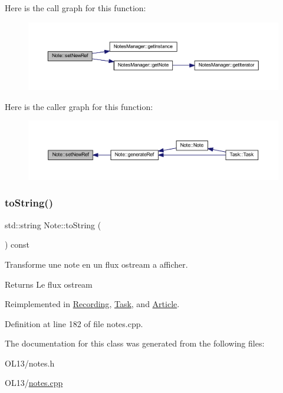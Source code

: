 Here is the call graph for this function\+:\nopagebreak
\begin{figure}[H]
\begin{center}
\leavevmode
\includegraphics[width=350pt]{class_note_a3af2edc369310b9f122bd1fd6dbfa717_cgraph}
\end{center}
\end{figure}
Here is the caller graph for this function\+:\nopagebreak
\begin{figure}[H]
\begin{center}
\leavevmode
\includegraphics[width=350pt]{class_note_a3af2edc369310b9f122bd1fd6dbfa717_icgraph}
\end{center}
\end{figure}
\mbox{\label{class_note_a1bd4acfbde0b71d05fd7d4ca889bca2b}} 
\subsubsection{\texorpdfstring{to\+String()}{toString()}}
{\footnotesize\ttfamily std\+::string Note\+::to\+String (\begin{DoxyParamCaption}{ }\end{DoxyParamCaption}) const\hspace{0.3cm}{\ttfamily [virtual]}}



Transforme une note en un flux ostream a afficher. 

\begin{DoxyReturn}{Returns}
Le flux ostream 
\end{DoxyReturn}


Reimplemented in \hyperlink{class_recording_a9f403a39bec2db40c9171a6c3a20942d}{Recording}, \hyperlink{class_task_a7fe5cb7b57a21693e7abfea2f9618563}{Task}, and \hyperlink{class_article_ae40d268ecffbaaa549968a81ea609ba4}{Article}.



Definition at line 182 of file notes.\+cpp.



The documentation for this class was generated from the following files\+:\begin{DoxyCompactItemize}
\item 
O\+L13/notes.\+h\item 
O\+L13/\hyperlink{notes_8cpp}{notes.\+cpp}\end{DoxyCompactItemize}
